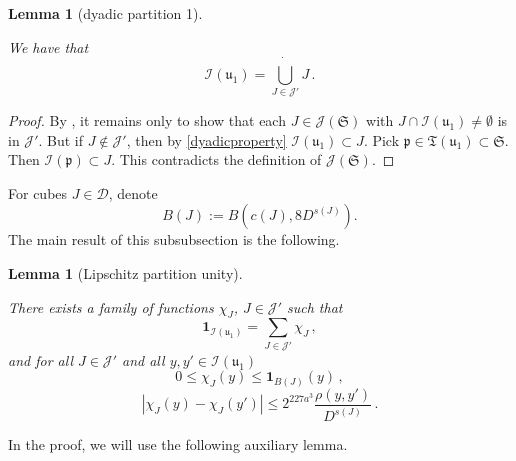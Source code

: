 \documentclass[10pt,a4paper]{article}
\theoremstyle{plain}
\newtheorem{lemma}[theorem]{Lemma}
\theoremstyle{definition}
\numberwithin{equation}{subsection}
\newcommand{\fp}{{\mathfrak p}}
\newcommand{\fu}{{\mathfrak u}}
\newcommand{\fT}{{\mathfrak T}}
\newcommand{\scI}{{\mathcal{I}}} %
\newcommand{\lean}[1]{}
\newcommand{\uses}[1]{}
\newcommand{\leanok}{}
\begin{document}
    \begin{lemma}[dyadic partition 1]
        \label{dyadic-partition-1}
        \leanok
        \lean{TileStructure.Forest.union_𝓙₅, TileStructure.Forest.pairwiseDisjoint_𝓙₅}
        \uses{dyadic-partitions}
        We have that
        $$
            \scI(\fu_1) = \dot{\bigcup_{J \in \mathcal{J}'}} J\,.
        $$
    \end{lemma}

    \begin{proof}
        \leanok
        By , it remains only to show that each $J \in \mathcal{J}(\mathfrak{S})$ with $J \cap \scI(\fu_1) \ne \emptyset$ is in $\mathcal{J}'$. But if $J \notin \mathcal{J}'$, then by \eqref{dyadicproperty} $\scI(\fu_1) \subset J$. Pick $\fp \in \fT(\fu_1) \subset \mathfrak{S}$. Then $\scI(\fp) \subset J$. This contradicts the definition of $\mathcal{J}(\mathfrak{S})$.
    \end{proof}

    For cubes $J \in \mathcal{D}$, denote
    \begin{equation}
        \label{def-BJ}
        B(J) := B(c(J), 8D^{s(J)}).
    \end{equation}
    The main result of this subsubsection is the following.

    \begin{lemma}[Lipschitz partition unity]
        \label{Lipschitz-partition-unity}
        \leanok
        \lean{TileStructure.Forest.sum_χ, TileStructure.Forest.χ_le_indicator,
          TileStructure.Forest.dist_χ_le}
        \uses{dyadic-partition-1,moderate-scale-change}
        There exists a family of functions $\chi_J$, $J \in \mathcal{J}'$ such that \begin{equation}
            \label{eq-pao-1}
            \mathbf{1}_{\scI(\fu_1)} = \sum_{J \in \mathcal{J}'} \chi_J\,,
        \end{equation}
        and for all $J \in \mathcal{J}'$ and all $y,y' \in \scI(\fu_1)$
      \begin{equation}
            \label{eq-pao-2}
            0 \leq \chi_J(y) \leq \mathbf{1}_{B(J)}(y)\,,
        \end{equation}
      \begin{equation}
            \label{eq-pao-3}
            |\chi_J(y) - \chi_J(y')| \le 2^{227a^3} \frac{\rho(y,y')}{D^{s(J)}}\,.
        \end{equation}
    \end{lemma}

    In the proof, we will use the following auxiliary lemma.
\end{document}
